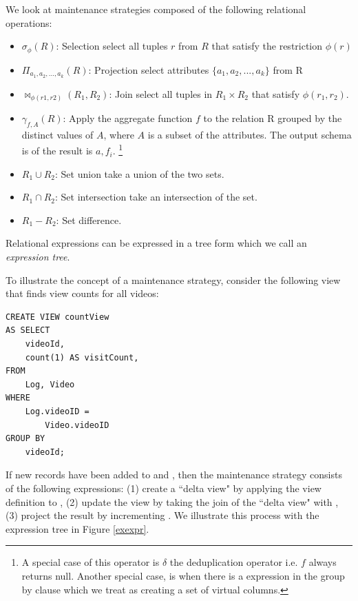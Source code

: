 We look at maintenance strategies composed of the following relational operations:
\begin{itemize}\vspace{-.45em}
\item $\sigma_{\phi}(R)$: Selection select all tuples $r$ from $R$ that satisfy the restriction $\phi (r)$ \vspace{-.45em}
\item $\Pi_{a_1,a_2,...,a_k}(R)$: Projection select attributes $\{a_1,a_2,...,a_k\}$ from R \vspace{-.45em}
\item $\bowtie_{\phi (r1,r2)}(R_1,R_2)$: Join select all tuples in $R_1 \times R_2$ that satisfy $\phi (r_1,r_2)$.
\item $\gamma_{f,A}(R)$: Apply the aggregate function $f$ to the relation R grouped by the distinct values of $A$, where $A$ is a subset of the attributes. The output schema is of the result is $a, f_i$. \footnote{A special case of this operator is $\delta$ the deduplication operator i.e. $f$ always returns null. Another special case, is when there is a expression in the group by clause which we treat as creating a set of virtual columns.}\vspace{-.45em} 
\item $R_1 \cup R_2$: Set union take a union of the two sets.
\item $R_1 \cap R_2$: Set intersection take an intersection of the set.
\item $R_1 - R_2$: Set difference.
\end{itemize}
Relational expressions can be expressed in a tree form which we call an \emph{expression tree}.

To illustrate the concept of a maintenance strategy, consider the following view that finds view counts for all videos:
\begin{lstlisting} 
CREATE VIEW countView
AS SELECT 
	videoId,
	count(1) AS visitCount,
FROM 
	Log, Video
WHERE 
	Log.videoID = 
		Video.videoID
GROUP BY 
	videoId;
\end{lstlisting}
If new records have been added to  and , then the maintenance strategy consists of the following expressions: (1) create a ``delta view" by applying the view definition to , (2) update the view by taking the join of the ``delta view" with , (3) project the result by incrementing . We illustrate this process with the expression tree in Figure \ref{exexpr}.

